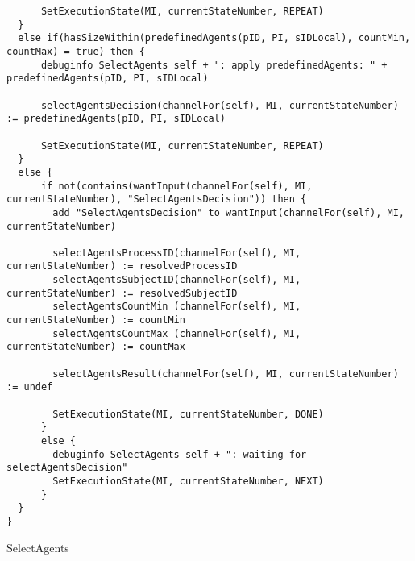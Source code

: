 \begin{listing}[H]
\begin{verbatim}
      SetExecutionState(MI, currentStateNumber, REPEAT)
  }
  else if(hasSizeWithin(predefinedAgents(pID, PI, sIDLocal), countMin, countMax) = true) then {
      debuginfo SelectAgents self + ": apply predefinedAgents: " + predefinedAgents(pID, PI, sIDLocal)

      selectAgentsDecision(channelFor(self), MI, currentStateNumber) := predefinedAgents(pID, PI, sIDLocal)

      SetExecutionState(MI, currentStateNumber, REPEAT)
  }
  else {
      if not(contains(wantInput(channelFor(self), MI, currentStateNumber), "SelectAgentsDecision")) then {
        add "SelectAgentsDecision" to wantInput(channelFor(self), MI, currentStateNumber)

        selectAgentsProcessID(channelFor(self), MI, currentStateNumber) := resolvedProcessID
        selectAgentsSubjectID(channelFor(self), MI, currentStateNumber) := resolvedSubjectID
        selectAgentsCountMin (channelFor(self), MI, currentStateNumber) := countMin
        selectAgentsCountMax (channelFor(self), MI, currentStateNumber) := countMax

        selectAgentsResult(channelFor(self), MI, currentStateNumber) := undef

        SetExecutionState(MI, currentStateNumber, DONE)
      }
      else {
        debuginfo SelectAgents self + ": waiting for selectAgentsDecision"
        SetExecutionState(MI, currentStateNumber, NEXT)
      }
  }
}
\end{verbatim}
\caption{SelectAgents}
\label{lst:asm:SelectAgents}
\end{listing}
